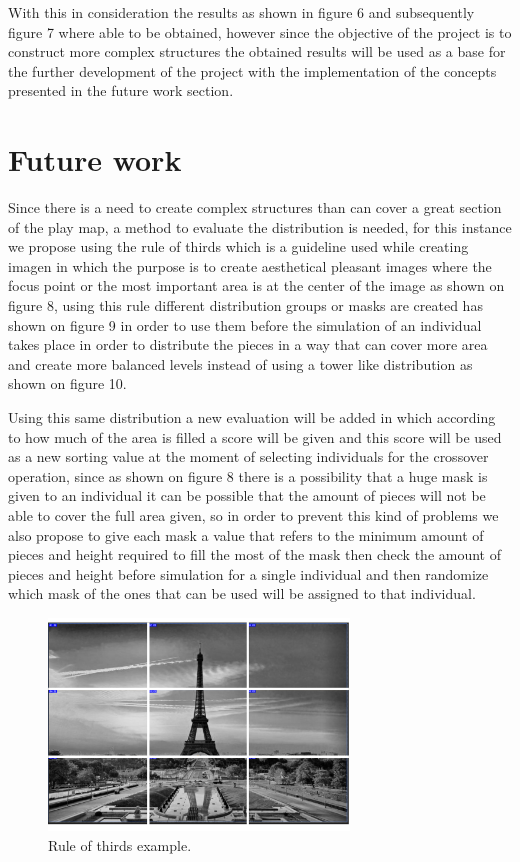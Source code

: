 \documentclass[graybox]{svmult}
\begin{document}
With this in consideration the results as shown in figure 6 and subsequently figure 7 where able to be obtained, however since the objective of the project is to construct more complex structures the obtained results will be used as a base for the further development of the project with the implementation of the concepts presented in the future work section.

\section{Future work}
Since there is a need to create complex structures than can cover a great section of the play map, a method to evaluate the distribution is needed, for this instance we propose using the rule of thirds \cite{DarrenRowse} which is a guideline used while creating imagen in which the purpose is to create aesthetical pleasant images where the focus point or the most important area is at the center of the image as shown on figure 8, using this rule different distribution groups or masks are created has shown on figure 9 in order to use them before the simulation of an individual takes place in order to distribute the pieces in a way that can cover more area and create more balanced levels instead of using a tower like distribution as shown on figure 10.

Using this same distribution a new evaluation will be added in which according to how much of the area is filled a score will be given and this score will be used as a new sorting value at the moment of selecting individuals for the crossover operation, since as shown on figure 8 there is a possibility that a huge mask is given to an individual it can be possible that the amount of pieces will not be able to cover the full area given, so in order to prevent this kind of problems we also propose to give each mask a value that refers to the minimum amount of pieces and height required to fill the most of the mask then check the amount of pieces and height before simulation for a single individual and then randomize which mask of the ones that can be used will be assigned to that individual.

\begin{figure}[htbp]
    \centerline{\includegraphics[width=80mm]{Images/ruleofthirds_example.png}}
    \caption{Rule of thirds example.}
    \label{fig}
\end{figure}
\end{document}
